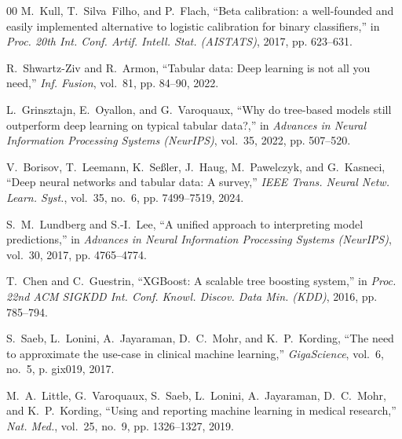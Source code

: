 \documentclass[conference]{IEEEtran}
\begin{document}
\begin{thebibliography}{00}
M.~Kull, T.~Silva~Filho, and P.~Flach, ``Beta calibration: a well-founded and easily implemented alternative to logistic calibration for binary classifiers,'' in \textit{Proc. 20th Int. Conf. Artif. Intell. Stat. (AISTATS)}, 2017, pp. 623--631.

R.~Shwartz-Ziv and R.~Armon, ``Tabular data: Deep learning is not all you need,'' \textit{Inf. Fusion}, vol.~81, pp. 84--90, 2022.

L.~Grinsztajn, E.~Oyallon, and G.~Varoquaux, ``Why do tree-based models still outperform deep learning on typical tabular data?,'' in \textit{Advances in Neural Information Processing Systems (NeurIPS)}, vol.~35, 2022, pp. 507--520.

V.~Borisov, T.~Leemann, K.~Se\ss{}ler, J.~Haug, M.~Pawelczyk, and G.~Kasneci, ``Deep neural networks and tabular data: A survey,'' \textit{IEEE Trans. Neural Netw. Learn. Syst.}, vol.~35, no.~6, pp. 7499--7519, 2024.

S.~M.~Lundberg and S.-I.~Lee, ``A unified approach to interpreting model predictions,'' in \textit{Advances in Neural Information Processing Systems (NeurIPS)}, vol.~30, 2017, pp. 4765--4774.

T.~Chen and C.~Guestrin, ``XGBoost: A scalable tree boosting system,'' in \textit{Proc. 22nd ACM SIGKDD Int. Conf. Knowl. Discov. Data Min. (KDD)}, 2016, pp. 785--794.

S.~Saeb, L.~Lonini, A.~Jayaraman, D.~C.~Mohr, and K.~P.~Kording, ``The need to approximate the use-case in clinical machine learning,'' \textit{GigaScience}, vol.~6, no.~5, p. gix019, 2017.

M.~A.~Little, G.~Varoquaux, S.~Saeb, L.~Lonini, A.~Jayaraman, D.~C.~Mohr, and K.~P.~Kording, ``Using and reporting machine learning in medical research,'' \textit{Nat. Med.}, vol.~25, no.~9, pp. 1326--1327, 2019.
\end{thebibliography}
\end{document}
